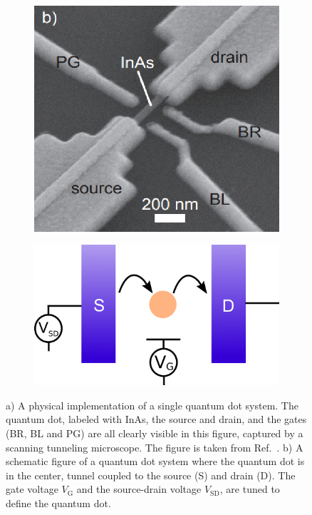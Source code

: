 \documentclass[../main.tex]{subfiles}
\begin{document}
\begin{figure}[H]
\centering
\begin{subfigure}[t]{.5\textwidth}
  \centering
  \includegraphics[width=.8\linewidth]{figures/qdotsem.png}
  \caption{}
  \label{fig:sem}
\end{subfigure}%
\begin{subfigure}[t]{.5\textwidth}
  \centering
  \includegraphics[width=.9\linewidth]{figures/qdotschematic.png}
  \caption{}
  \label{fig:qdotscheme}
\end{subfigure}
\caption{a) A physical implementation of a single quantum dot system. The quantum dot, labeled with InAs, the source and drain, and the gates (BR, BL and PG) are all clearly visible in this figure, captured by a scanning tunneling microscope. The figure is taken from Ref.~\cite{sven}. b) A schematic figure of a quantum dot system where the quantum dot is in the center, tunnel coupled to the source (S) and drain (D). The gate voltage $V_\text{G}$ and the source-drain voltage $V_\text{SD}$, are tuned to define the quantum dot.}
\label{fig:qdot}
\end{figure}
\end{document}

